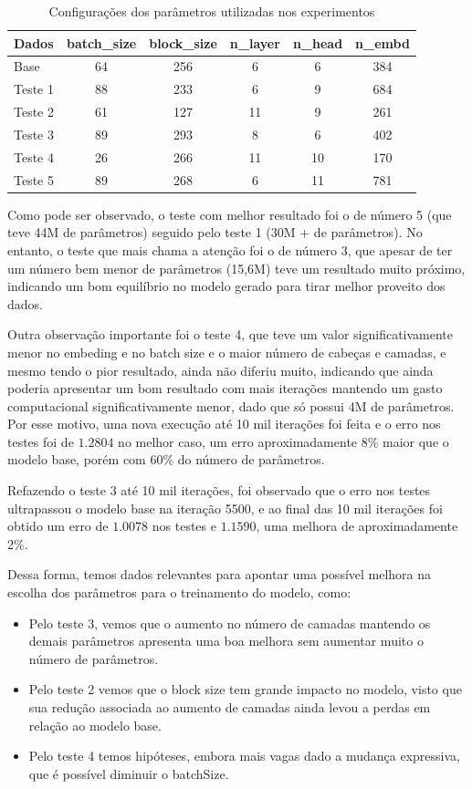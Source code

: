 \documentclass[9pt,technote]{IEEEtran}
\begin{document}
\begin{table}[ht]
    \centering
    \caption{Configurações dos parâmetros utilizadas nos experimentos}
    \label{tab:parametros_experimentos}
    \begin{tabular}{lccccc}
        \hline
        \textbf{Dados} & \textbf{batch\_size} & \textbf{block\_size} & 
        \textbf{n\_layer} & \textbf{n\_head} & \textbf{n\_embd} \\
        \hline
        Base    & 64 & 256 & 6  & 6  & 384 \\
        Teste 1 & 88 & 233 & 6  & 9  & 684 \\
        Teste 2 & 61 & 127 & 11 & 9  & 261 \\
        Teste 3 & 89 & 293 & 8  & 6  & 402 \\
        Teste 4 & 26 & 266 & 11 & 10 & 170 \\
        Teste 5 & 89 & 268 & 6  & 11 & 781 \\
        \hline
    \end{tabular}
\end{table}

Como pode ser observado, o teste com melhor resultado foi o de número 5 (que teve 44M de parâmetros) seguido pelo teste 1 (30M + de parâmetros). No entanto, o teste que mais chama a atenção foi o de número 3, que apesar de ter um número bem menor de parâmetros (15,6M) teve um resultado muito próximo, indicando um bom equilíbrio no modelo gerado para tirar melhor proveito dos dados.

Outra observação importante foi o teste 4, que teve um valor significativamente menor no embeding e no batch size e o maior número de cabeças e camadas, e mesmo tendo o pior resultado, ainda não diferiu muito, indicando que ainda poderia apresentar um bom resultado com mais iterações mantendo um gasto computacional significativamente menor, dado que só possui 4M de parâmetros. Por esse motivo, uma nova execução até 10 mil iterações foi feita e o erro nos testes foi de $1.2804$ no melhor caso, um erro aproximadamente 8\% maior que o modelo base, porém com 60\% do número de parâmetros.

Refazendo o teste 3 até 10 mil iterações, foi observado que o erro nos testes ultrapassou o modelo base na iteração 5500, e ao final das 10 mil iterações foi obtido um erro de $1.0078$ nos testes e $1.1590$, uma melhora de aproximadamente 2\%.

Dessa forma, temos dados relevantes para apontar uma possível melhora na escolha dos parâmetros para o treinamento do modelo, como:
\begin{itemize}
    \item Pelo teste 3, vemos que o aumento no número de camadas mantendo os demais parâmetros apresenta uma boa melhora sem aumentar muito o número de parâmetros.
    \item Pelo teste 2 vemos que o block size tem grande impacto no modelo, visto que sua redução associada ao aumento de camadas ainda levou a perdas em relação ao modelo base.
    \item Pelo teste 4 temos hipóteses, embora mais vagas dado a mudança expressiva, que é possível diminuir o batchSize.
\end{itemize}
\end{document}
